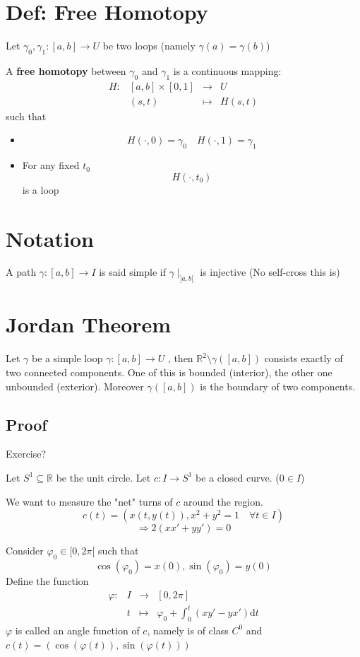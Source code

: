 \documentclass{book}
\newcommand{\leftbracket}{[}
\newcommand{\rightbracket}{]}
\begin{document}
\section{Def: Free Homotopy}
Let $\gamma_0,\gamma_1:[a,b]\rightarrow U$ be two loops (namely $\gamma(a)=\gamma(b)$)

A \textbf{free homotopy} between $\gamma_0$ and $\gamma_1$ is a continuous mapping:
$$\begin{aligned}
    H:&[a,b]\times[0,1]&\rightarrow&U\\
    &(s,t)&\mapsto&H(s,t)
\end{aligned}$$
such that\begin{itemize}
    \item $$H(\cdot,0)=\gamma_0\quad H(\cdot,1)=\gamma_1$$
    \item For any fixed $t_0$$$H(\cdot,t_0)$$ is a loop
\end{itemize}
\section{Notation}
A path $\gamma:[a,b]\rightarrow I$ is said simple if $\gamma\mid_{\rightbracket a,b\leftbracket}$ is injective (No self-cross this is)
\section{Jordan Theorem}
Let $\gamma$ be a simple loop $\gamma:[a,b]\rightarrow U$ , then $\mathbb{R}^2\setminus\gamma([a,b])$ consists exactly of two connected components. One of this is bounded (interior), the other one unbounded (exterior). Moreover $\gamma([a,b])$ is the boundary of two components.
\subsection*{Proof}Exercise?

Let $S^1\subseteq \mathbb{R}$ be the unit circle. Let $c:I\rightarrow S^1$ be a closed curve. ($0\in I$)

We want to measure the "net" turns of $c$ around the region.
$$c(t)=(x(t,y(t)), x^2+y^2=1\quad \forall t\in I)$$
$$\Rightarrow 2(xx'+yy')=0$$

Consider $\varphi_0\in \leftbracket 0, 2\pi\leftbracket$ such that $$\cos(\varphi_0)=x(0),\sin(\varphi_0)=y(0)$$
Define the function $$\begin{aligned}
    \varphi:&I&\rightarrow&\leftbracket 0,2\pi\rightbracket\\
    &t&\mapsto&\varphi_0+\int_0^t(xy'-yx')\text{d}t
\end{aligned}$$
$\varphi$ is called an angle function of $c$, namely is of class $C^0$ and $c(t)=(\cos(\varphi(t)),\sin(\varphi(t)))$
\end{document}
